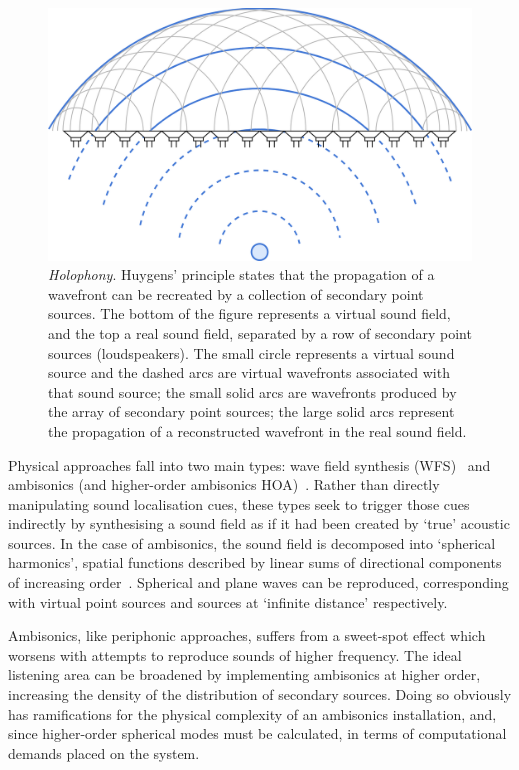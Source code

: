 \documentclass[utf8]{FrontiersinHarvard}
\begin{document}
    \begin{figure}[ht]
        \centering
        \includegraphics[width=.75\textwidth]{figures/wfs_1}
        \caption{\textit{Holophony}.
        Huygens' principle states that the propagation of a wavefront
        can be recreated by a collection of secondary point sources.
        The bottom of the figure represents a virtual sound field, and the top a
        real sound field, separated by a row of secondary point sources
            (loudspeakers).
            The small circle represents a virtual sound source and the dashed arcs
            are virtual wavefronts associated with that sound source;
            the small solid arcs are wavefronts produced by the array of secondary
            point sources;
            the large solid arcs represent the propagation of a reconstructed
            wavefront in the real sound field.}
        \label{fig:wfs_1}
    \end{figure}

    Physical approaches fall into two main types: wave field synthesis
    (WFS)~\citep{berkhout_acoustic_1993} and
    ambisonics (and higher-order ambisonics \textemdash{}
    HOA)~\citep{frank_producing_2015}.
    Rather than directly manipulating sound localisation cues, these types seek to
    trigger those cues indirectly by synthesising a sound field as if it had been
    created by `true' acoustic sources.
    In the case of ambisonics, the sound field is decomposed into `spherical
    harmonics', spatial functions described by linear sums of directional
    components of increasing order~\citep{nicol_sound_2017}.
    Spherical and plane waves can be reproduced, corresponding with virtual
    point sources and sources at `infinite distance' respectively.

    Ambisonics, like periphonic approaches, suffers from a sweet-spot effect which
    worsens with attempts to reproduce sounds of higher frequency.
    The ideal listening area can be broadened by implementing ambisonics at higher
    order, increasing the density of the distribution of secondary sources.
    Doing so obviously has ramifications for the physical complexity of an
    ambisonics installation, and, since higher-order spherical modes must be
    calculated, in terms of computational demands placed on the system.
\end{document}
